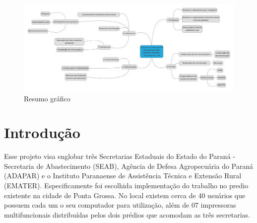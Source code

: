 \documentclass[	DIV=calc,%
							paper=a4,%
							fontsize=12pt,%
							onecolumn]{scrartcl}	 					%
\begin{document}
\begin{figure}[h]
	\centering
	\includegraphics[height=\textwidth,width=25cm,angle=-90,keepaspectratio]{figura1}
	\caption{Resumo gráfico}
	\label{figura1}	
\end{figure}

\clearpage
    \renewcommand*\listfigurename{Lista de figuras}
\listoffigures

\renewcommand*\listtablename{Lista de tabelas}
\listoftables




\clearpage
\renewcommand{\contentsname}{Sumário}
\tableofcontents
\clearpage

\section{Introdução}
Esse projeto visa englobar três Secretarias Estaduais do Estado do Paraná - Secretaria de Abastecimento (SEAB), Agência de Defesa Agropecuária do Paraná (ADAPAR) e o Instituto Paranaense de Assistência Técnica e Extensão Rural (EMATER). Especificamente foi escolhida implementação do trabalho no predio existente na cidade de Ponta Grossa.
No local existem cerca de 40 usuários que possuem cada um o seu computador para utilização, além de 07 impressoras multifuncionais distribuídas pelos dois prédios que acomodam as três secretarias. %
\end{document}
